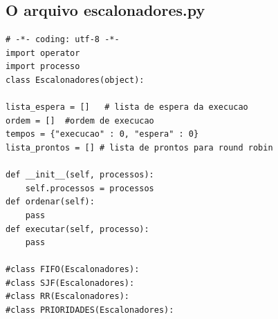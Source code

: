 \documentclass[times, 10pt,twocolumn]{article}
\begin{document}
\subsection{O arquivo escalonadores.py} 
\begin{lstlisting}
# -*- coding: utf-8 -*-
import operator
import processo
class Escalonadores(object):

lista_espera = []   # lista de espera da execucao
ordem = []  #ordem de execucao
tempos = {"execucao" : 0, "espera" : 0}
lista_prontos = [] # lista de prontos para round robin   

def __init__(self, processos):
	self.processos = processos
def ordenar(self):
	pass
def executar(self, processo):
	pass

#class FIFO(Escalonadores):
#class SJF(Escalonadores): 
#class RR(Escalonadores): 
#class PRIORIDADES(Escalonadores):
\end{lstlisting} 
\end{document}
